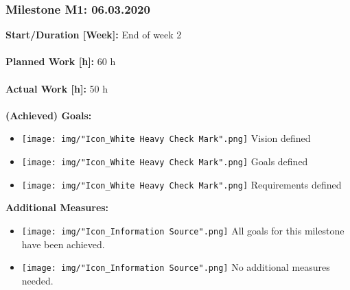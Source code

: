 			\subsubsection{Milestone M1: 06.03.2020}
				\textbf{Start/Duration [Week]:} End of week 2 \\~\\
				\textbf{Planned Work [h]:} 60 h \\~\\
				\textbf{Actual Work [h]:} 50 h \\~\\
				\textbf{(Achieved) Goals:}
				\begin{itemize}
					\item \texttt{[image: img/"Icon\_White Heavy Check Mark".png]} Vision defined
					\item \texttt{[image: img/"Icon\_White Heavy Check Mark".png]} Goals defined
					\item \texttt{[image: img/"Icon\_White Heavy Check Mark".png]} Requirements defined
				\end{itemize}
				\textbf{Additional Measures:}
				\begin{itemize}
					\item \texttt{[image: img/"Icon\_Information Source".png]} All goals for this milestone have been achieved.
					\item \texttt{[image: img/"Icon\_Information Source".png]} No additional measures needed.
				\end{itemize}


